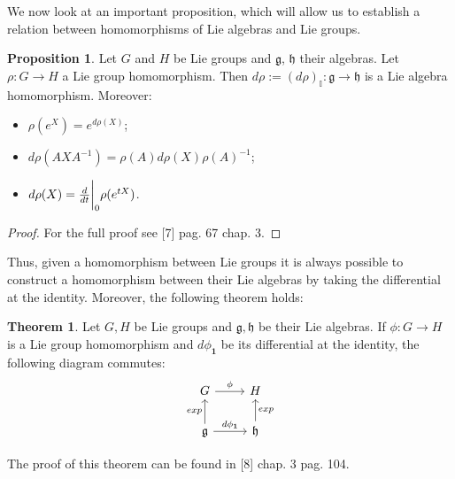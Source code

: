 \documentclass[12pt,a4paper]{report}
\theoremstyle{definition}
\theoremstyle{Theorem}
\newtheorem{Theo}[Def]{Theorem}
\newtheorem{Prop}[Def]{Proposition}
\theoremstyle{definition}
\theoremstyle{definition}
\begin{document}
	We now look at an important proposition, which will allow us to establish a relation between homomorphisms of Lie algebras and Lie groups.
	\begin{Prop} \label{Prop: 2.4.1}
		Let $G$ and $H$ be Lie groups and $\mathfrak{g}$, $\mathfrak{h}$ their algebras. Let $\rho:G\rightarrow H$ a Lie group homomorphism. Then $d\rho:=(d\rho)_\mathbb{I}:\mathfrak{g}\rightarrow\mathfrak{h}$ is a Lie algebra homomorphism. Moreover:
		\begin{itemize}
			\item $\rho(e^X)=e^{d\rho(X)}$; 
			\item $d\rho(AXA^{-1})=\rho(A)d\rho(X)\rho(A)^{-1}$;
			\item $d\rho(X)={d\over dt}\bigg{\rvert}_0\rho(e^{tX})$.
		\end{itemize}
	\end{Prop}
	\begin{proof}
		For the full proof see [7] pag. 67 chap. 3.
	\end{proof}
	Thus, given a homomorphism between Lie groups it is always possible to construct a homomorphism between their Lie algebras by taking the differential at the identity. Moreover, the following theorem holds:
	\begin{Theo}
		Let $G,H$ be Lie groups and $\mathfrak{g},\mathfrak{h}$ be their Lie algebras. If $\phi:G\rightarrow H$ is a Lie group homomorphism and $d\phi_\textbf{1}$ be its differential at the identity, the following diagram commutes:\\
		\begin{equation*}
			\begin{tikzcd}
				G \arrow{r}{\phi} & H \\
				\mathfrak{g} \arrow{r}{d\phi_\textbf{1}} \arrow{u}{exp}& \mathfrak{h} \arrow[swap]{u}{exp} 
			\end{tikzcd}
		\end{equation*}
	\end{Theo}
	The proof of this theorem can be found in [8] chap. 3 pag. 104.
\end{document}
